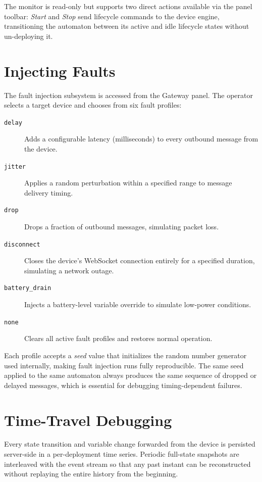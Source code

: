 The monitor is read-only but supports two direct actions available via the
panel toolbar: \textit{Start} and \textit{Stop} send lifecycle commands to the
device engine, transitioning the automaton between its active and idle lifecycle
states without un-deploying it.

\section{Injecting Faults}
\label{sec:demo-fault}

The fault injection subsystem is accessed from the Gateway panel. The operator
selects a target device and chooses from six fault profiles:

\begin{description}
  \item[\texttt{delay}] Adds a configurable latency (milliseconds) to every
    outbound message from the device.
  \item[\texttt{jitter}] Applies a random perturbation within a specified range
    to message delivery timing.
  \item[\texttt{drop}] Drops a fraction of outbound messages, simulating packet
    loss.
  \item[\texttt{disconnect}] Closes the device's WebSocket connection entirely
    for a specified duration, simulating a network outage.
  \item[\texttt{battery\_drain}] Injects a battery-level variable override to
    simulate low-power conditions.
  \item[\texttt{none}] Clears all active fault profiles and restores normal
    operation.
\end{description}

\noindent Each profile accepts a \textit{seed} value that initializes the
random number generator used internally, making fault injection runs fully
reproducible. The same seed applied to the same automaton always produces the
same sequence of dropped or delayed messages, which is essential for debugging
timing-dependent failures.

\section{Time-Travel Debugging}
\label{sec:demo-replay}

Every state transition and variable change forwarded from the device is
persisted server-side in a per-deployment time series.  Periodic full-state
snapshots are interleaved with the event stream so that any past instant can be
reconstructed without replaying the entire history from the beginning.

